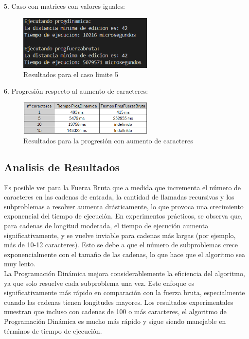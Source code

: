 5. Caso con matrices con valores iguales:\\
\begin{figure}[ht]
  \centering
  \includegraphics[width=0.6\textwidth]{./images/Resultados5.png}
  \caption{Resultados para el caso limite 5}
  \label{fig:imagen}
\end{figure}

6. Progresión respecto al aumento de caracteres:\\
\begin{figure}[ht]
  \centering
  \includegraphics[width=0.6\textwidth]{./images/Resultados6.png}
  \caption{Resultados para la progresión con aumento de caracteres}
  \label{fig:imagen}
\end{figure}
\newpage
\subsection{Analisis de Resultados}

Es posible ver para la Fuerza Bruta que a medida que incrementa el número de caracteres en las cadenas de entrada, la cantidad de llamadas recursivas y los subproblemas a resolver aumenta drásticamente, lo que provoca una crecimiento exponencial del tiempo de ejecución. En experimentos prácticos, se observa que, para cadenas de longitud moderada, el tiempo de ejecución aumenta significativamente, y se vuelve inviable para cadenas más largas (por ejemplo, más de 10-12 caracteres). Esto se debe a que el número de subproblemas crece exponencialmente con el tamaño de las cadenas, lo que hace que el algoritmo sea muy lento.\\

La Programación Dinámica mejora considerablemente la eficiencia del algoritmo, ya que solo resuelve cada subproblema una vez. Este enfoque es significativamente más rápido en comparación con la fuerza bruta, especialmente cuando las cadenas tienen longitudes mayores. Los resultados experimentales muestran que incluso con cadenas de 100 o más caracteres, el algoritmo de Programación Dinámica es mucho más rápido y sigue siendo manejable en términos de tiempo de ejecución.\\

